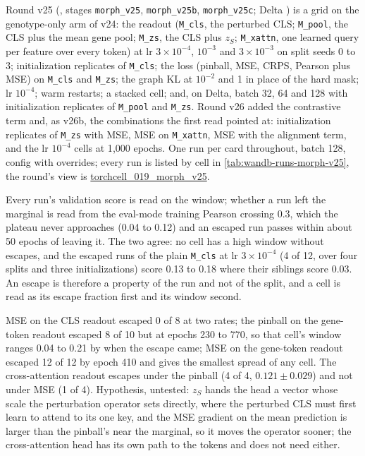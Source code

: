  Round v25 (, stages \texttt{morph\_v25},
\texttt{morph\_v25b}, \texttt{morph\_v25c}; Delta ) is a
grid on the genotype-only arm of v24: the readout (\texttt{M\_cls}, the perturbed CLS;
\texttt{M\_pool}, the CLS plus the mean gene pool; \texttt{M\_zs}, the CLS plus $z_S$;
\texttt{M\_xattn}, one learned query per feature over every token) at lr $3\times10^{-4}$,
$10^{-3}$ and $3\times10^{-3}$ on split seeds 0 to 3; initialization replicates of
\texttt{M\_cls}; the loss (pinball, MSE, CRPS, Pearson plus MSE) on \texttt{M\_cls} and
\texttt{M\_zs}; the graph KL at $10^{-2}$ and 1 in place of the hard mask; lr $10^{-4}$; warm
restarts; a stacked cell; and, on Delta, batch 32, 64 and 128 with initialization replicates of
\texttt{M\_pool} and \texttt{M\_zs}. Round v26 added the contrastive term and, as v26b, the
combinations the first read pointed at: initialization replicates of \texttt{M\_zs} with MSE,
MSE on \texttt{M\_xattn}, MSE with the alignment term, and the lr $10^{-4}$ cells at 1{,}000
epochs. One run per card throughout, batch 128, config  with overrides;
every run is listed by cell in \cref{tab:wandb-runs-morph-v25}, the round's view is
\href{https://wandb.ai/zhao-group/torchcell_019_morph_v25?nw=xbewyhsxbtr}{torchcell\_019\_morph\_v25}.



 Every run's validation score is read on
the window; whether a run left the marginal is read from the eval-mode training Pearson
crossing 0.3, which the plateau never approaches (0.04 to 0.12) and an escaped run passes
within about 50 epochs of leaving it. The two agree: no cell has a high window without
escapes, and the escaped runs of the plain \texttt{M\_cls} at lr $3\times10^{-4}$ (4 of 12,
over four splits and three initializations) score 0.13 to 0.18 where their siblings score
0.03. An escape is therefore a property of the run and not of the split, and a cell is
read as its escape fraction first and its window second.

 MSE on the CLS readout escaped 0 of 8 at two rates; the
pinball on the gene-token readout escaped 8 of 10 but at epochs 230 to 770, so that cell's
window ranges 0.04 to 0.21 by when the escape came; MSE on the gene-token readout escaped
12 of 12 by epoch 410 and gives the smallest spread of any cell. The cross-attention
readout escapes under the pinball (4 of 4, $0.121 \pm 0.029$) and not under MSE (1 of 4).
Hypothesis, untested: $z_S$ hands the head a vector whose scale the perturbation operator
sets directly, where the perturbed CLS must first learn to attend to its one key, and the
MSE gradient on the mean prediction is larger than the pinball's near the marginal, so it
moves the operator sooner; the cross-attention head has its own path to the tokens and
does not need either.

